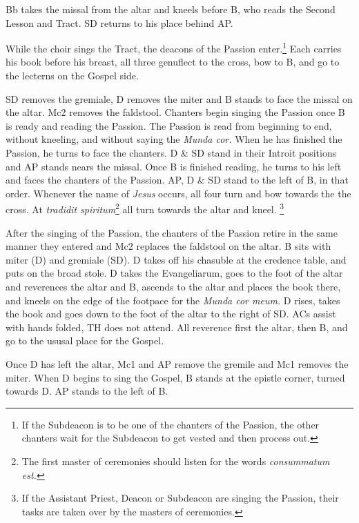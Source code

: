 {    \rubric Bb takes the missal from the altar and kneels before B, who reads
    the Second Lesson and Tract. SD returns to his place behind AP.

    \rubric While the choir sings the Tract, the deacons of the Passion
    enter.\footnote{If the Subdeacon is to be one of the chanters of the
    Passion, the other chanters wait for the Subdeacon to get vested and then
process out.} Each carries his book before his breast, all three genuflect to
the cross, bow to B, and go to the lecterns on the Gospel side.

    \rubric SD removes the gremiale, D removes the miter and B stands to face
    the missal on the altar. Mc2 removes the faldstool. Chanters begin singing
    the Passion once B is ready and reading the Passion. The Passion is read
    from beginning to end, without kneeling, and without saying the
    \textit{Munda cor.} When he has finished the Passion, he turns to face the
    chanters. D \& SD stand in their Introit positions and AP stands nears the
    missal. Once B is finished reading, he turns to his left and faces the
    chanters of the Passion. AP, D \& SD stand to the left of B, in that order.
    Whenever the name of \textit{Jesus} occurs, all four turn and bow towards
    the the cross. At \textit{tradidit spiritum}\footnote{The first master of
        ceremonies should listen for the words \textit{consummatum est.}} all
        turn towards the altar and kneel. \footnote{If the Assistant Priest,
        Deacon or Subdeacon are singing the Passion, their tasks are taken over
    by the masters of ceremonies.}

    \rubric After the singing of the Passion, the chanters of the Passion
    retire in the same manner they entered and Mc2 replaces the faldstool on
    the altar. B sits with miter (D) and gremiale (SD). D takes off his
    chasuble at the credence table, and puts on the broad stole. D takes the
    Evangeliarum, goes to the foot of the altar and reverences the altar and B,
    ascends to the altar and places the book there, and kneels on the edge of
    the footpace for the \textit{Munda cor meum.} D rises, takes the book and
    goes down to the foot of the altar to the right of SD. ACs assist with
    hands folded, TH does not attend. All reverence first the altar, then B,
    and go to the ususal place for the Gospel.

    \rubric Once D has left the altar, Mc1 and AP remove the gremile and Mc1
    removes the miter. When D begins to sing the Gospel, B stands at the
    epistle corner, turned towards D. AP stands to the left of B.

}
